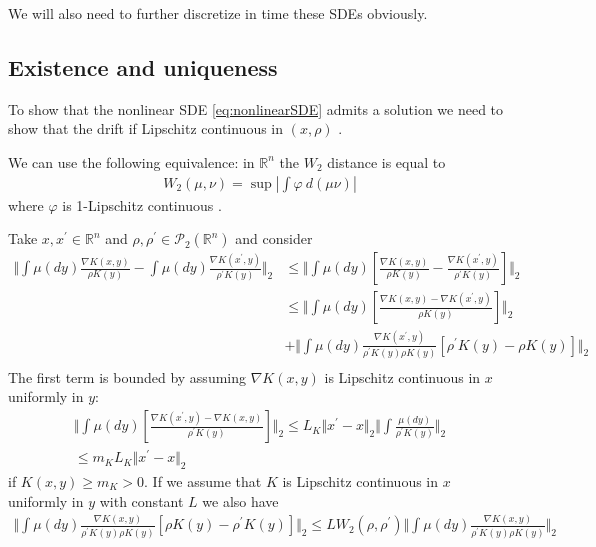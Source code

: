 \documentclass[a4paper]{article}
\newcommand{\norm}[2]{\ensuremath{\Vert #1 \Vert_{#2}}}
\def\real{\mathbb{R}}
\def\testfn{\varphi}
\begin{document}
We will also need to further discretize in time these SDEs obviously.

\subsection{Existence and uniqueness}
To show that the nonlinear SDE \eqref{eq:nonlinearSDE} admits a solution we need to show that the drift if Lipschitz continuous in $(x, \rho)$ \citep{jourdain2007nonlinear}.

We can use the following equivalence: in $\real^n$ the $W_2$ distance is equal to
\begin{align*}
W_2(\mu, \nu) = \sup\left\lvert \int \testfn \ d(\mu  \nu)\right\rvert
\end{align*}
where $\testfn$ is 1-Lipschitz continuous \citep[page 112]{santambrogio2017euclidean}.

Take $x, x^\prime\in \real^n$  and $\rho, \rho^\prime \in \mathcal{P}_2(\real^n)$ and consider
\begin{align*}
\norm{ \int\mu\left(dy\right)\frac{\nabla K(x,y)}{\rho K(y)}- \int\mu\left(dy\right)\frac{\nabla K(x^\prime,y)}{\rho^\prime K(y)}}{2} &\leq \norm{\int\mu\left(dy\right)\left[\frac{\nabla K(x,y)}{\rho K(y)}- \frac{\nabla K(x^\prime,y)}{\rho^\prime K(y)}\right]}{2} \\
&\leq \norm{\int\mu\left(dy\right)\left[\frac{\nabla K(x,y) - \nabla K(x^\prime,y)}{\rho K(y)}\right]}{2}\\
& +\norm{\int\mu\left(dy\right)\frac{\nabla K(x^\prime,y)}{\rho^\prime K(y)\rho K(y)}\left[\rho^\prime K(y) - \rho K(y)\right]}{2}
\\
\end{align*}
The first term is bounded by assuming $\nabla K(x, y)$ is Lipschitz continuous in $x$ uniformly in $y$:
\begin{align*}
\norm{\int\mu\left(dy\right)\left[\frac{\nabla K(x^\prime,y) - \nabla K(x,y)}{\rho^\prime K(y)}\right]}{2} \leq L_K\norm{x^\prime - x}{2}\norm{\int\frac{\mu\left(dy\right)}{\rho^\prime K(y)}}{2}\\
\leq m_K L_K\norm{x^\prime - x}{2}
\end{align*}
if $K(x, y) \geq m_K>0$.
If we assume that $K$ is Lipschitz continuous in $x$ uniformly in $y$ with constant $L$ we also have
\begin{align*}
\norm{\int\mu\left(dy\right)\frac{\nabla K(x,y)}{\rho^\prime K(y)\rho K(y)}\left[\rho K(y) - \rho^\prime K(y)\right]}{2} \leq LW_2(\rho, \rho^\prime)\norm{\int\mu\left(dy\right)\frac{\nabla K(x,y)}{\rho^\prime K(y)\rho K(y)}}{2}
\end{align*}
\end{document}
